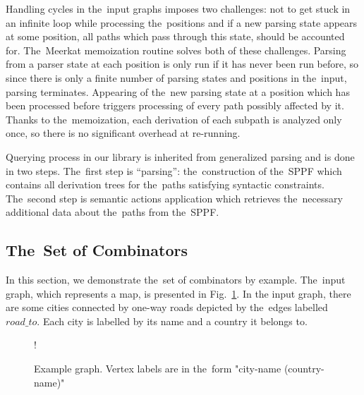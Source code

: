 Handling cycles in the~input graphs imposes two challenges: not to get stuck in an infinite loop while processing the~positions and if a new parsing state appears at some position, all paths which pass through this state, should be accounted for.
The~Meerkat memoization routine solves both of these challenges.
Parsing from a parser state at each position is only run if it has never been run before, so since there is only a finite number of parsing states and positions in the~input, parsing terminates.
Appearing of the~new parsing state at a position which has been processed before triggers processing of every path possibly affected by it.
Thanks to the~memoization, each derivation of each subpath is analyzed only once, so there is no significant overhead at re-running.


Querying process in our library is inherited from generalized parsing and is done in two steps.
The~first step is ``parsing'': the~construction of the~SPPF which contains all derivation trees for the~paths satisfying syntactic constraints.
The~second step is semantic actions application which retrieves the~necessary additional data about the~paths from the~SPPF.

\subsection{The~Set of Combinators}

In this section, we demonstrate the~set of combinators by example. The~input graph, which represents a map, is presented in Fig.~\ref{fig:graph}.
In the input graph, there are some cities connected by one-way roads depicted by the~edges labelled $road\_to$.
Each city is labelled by its name and a country it belongs to.

\begin{figure}[h]
 {!}
{
}
\caption{Example graph. Vertex labels are in the~form "city-name (country-name)"}
\label{fig:graph}
\end{figure}

